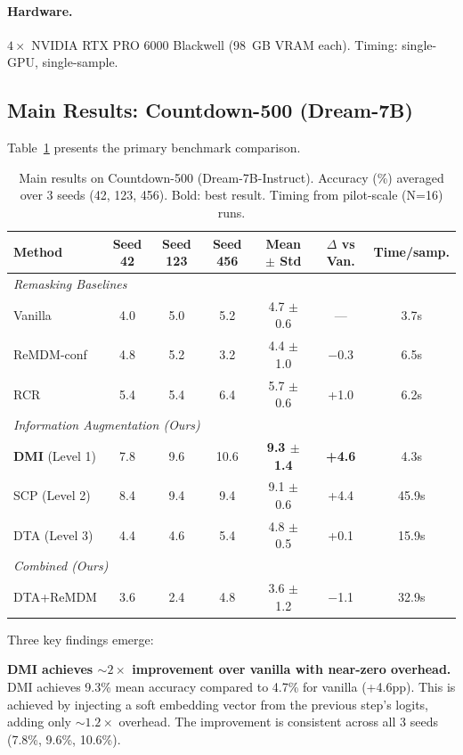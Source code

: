 \documentclass{article}
\begin{document}
\paragraph{Hardware.} $4{\times}$ NVIDIA RTX PRO 6000 Blackwell (98~GB VRAM each). Timing: single-GPU, single-sample.

\subsection{Main Results: Countdown-500 (Dream-7B)}
\label{sec:main_results}

Table~\ref{tab:main} presents the primary benchmark comparison.

\begin{table}[t]
\centering
\caption{Main results on Countdown-500 (Dream-7B-Instruct). Accuracy (\%) averaged over 3 seeds (42, 123, 456). Bold: best result. Timing from pilot-scale (N=16) runs.}
\label{tab:main}
\small
\begin{tabular}{lcccccc}
\toprule
\textbf{Method} & \textbf{Seed 42} & \textbf{Seed 123} & \textbf{Seed 456} & \textbf{Mean $\pm$ Std} & \textbf{$\Delta$ vs Van.} & \textbf{Time/samp.} \\
\midrule
\multicolumn{7}{l}{\emph{Remasking Baselines}} \\
Vanilla & 4.0 & 5.0 & 5.2 & 4.7 $\pm$ 0.6 & --- & 3.7s \\
ReMDM-conf & 4.8 & 5.2 & 3.2 & 4.4 $\pm$ 1.0 & $-$0.3 & 6.5s \\
RCR & 5.4 & 5.4 & 6.4 & 5.7 $\pm$ 0.6 & +1.0 & 6.2s \\
\midrule
\multicolumn{7}{l}{\emph{Information Augmentation (Ours)}} \\
\textbf{DMI} (Level 1) & 7.8 & 9.6 & 10.6 & \textbf{9.3 $\pm$ 1.4} & \textbf{+4.6} & 4.3s \\
SCP (Level 2) & 8.4 & 9.4 & 9.4 & 9.1 $\pm$ 0.6 & +4.4 & 45.9s \\
DTA (Level 3) & 4.4 & 4.6 & 5.4 & 4.8 $\pm$ 0.5 & +0.1 & 15.9s \\
\midrule
\multicolumn{7}{l}{\emph{Combined (Ours)}} \\
DTA+ReMDM & 3.6 & 2.4 & 4.8 & 3.6 $\pm$ 1.2 & $-$1.1 & 32.9s \\
\bottomrule
\end{tabular}
\end{table}

Three key findings emerge:

\textbf{DMI achieves ${\sim}2{\times}$ improvement over vanilla with near-zero overhead.} DMI achieves 9.3\% mean accuracy compared to 4.7\% for vanilla (+4.6pp). This is achieved by injecting a soft embedding vector from the previous step's logits, adding only ${\sim}1.2{\times}$ overhead. The improvement is consistent across all 3 seeds (7.8\%, 9.6\%, 10.6\%).
\end{document}
